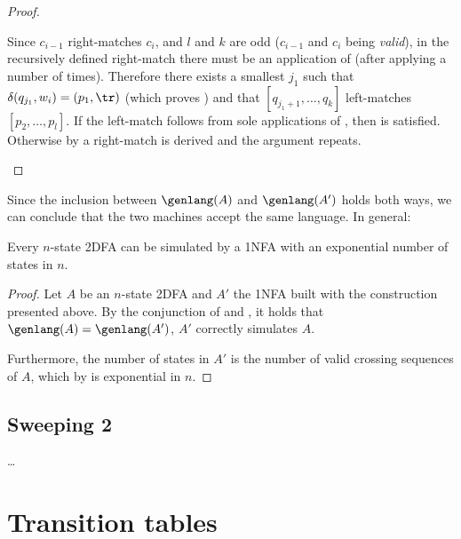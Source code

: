 \begin{proof}
\begin{description}
		      Since $c_{i-1}$ right-matches $c_i$, and $l$ and $k$ are odd ($c_{i-1}$ and $c_i$ being \emph{valid}), in the recursively defined right-match there must be an application of  (after applying  a number of times).
		      Therefore there exists a smallest $j_1$ such that $\delta(q_{j_1},w_i)=(p_1,\tr)$ (which proves ) and that $[q_{j_1+1},\dots,q_k]$ left-matches $[p_2,\dots,p_l]$.
		      If the left-match follows from sole applications of , then  is satisfied.
		      Otherwise by  a right-match is derived and the argument repeats. \qedhere
	\end{description}
\end{proof}

Since the inclusion between $\genlang(A)$ and $\genlang(A')$ holds both ways, we can conclude that the two machines accept the same language.
In general:
\begin{thrm}
	Every $n$-state 2DFA can be simulated by a 1NFA with an exponential number of states in $n$.
\end{thrm}
\begin{proof}
	Let $A$ be an $n$-state 2DFA and $A'$ the 1NFA built with the construction presented above.
	By the conjunction of  and , it holds that $\genlang(A)=\genlang(A')$, \ie $A'$ correctly simulates $A$.

	Furthermore, the number of states in $A'$ is the number of valid crossing sequences of $A$, which by  is exponential in $n$.
\end{proof}



\subsection{Sweeping 2\DFAs}
\dots


\section{Transition tables}

